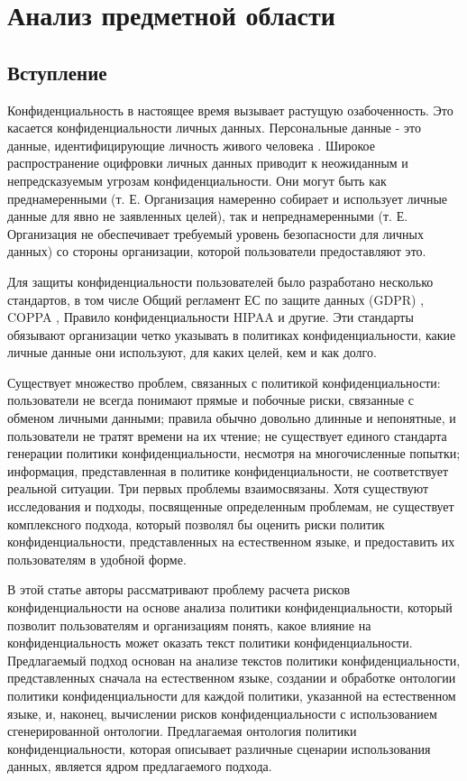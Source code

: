 \documentclass[../main]{subfiles}
\begin{document}
\newpage
\section{Анализ предметной области}

\subsection{Вступление}
Конфиденциальность в настоящее время вызывает растущую озабоченность. Это касается конфиденциальности личных данных. Персональные данные - это данные, идентифицирующие личность живого человека \cite{GDPR}. Широкое распространение оцифровки личных данных приводит к неожиданным и непредсказуемым угрозам конфиденциальности. Они могут быть как преднамеренными (т. Е. Организация намеренно собирает и использует личные данные для явно не заявленных целей), так и непреднамеренными (т. Е. Организация не обеспечивает требуемый уровень безопасности для личных данных) со стороны организации, которой пользователи предоставляют это.

Для защиты конфиденциальности пользователей было разработано несколько стандартов, в том числе Общий регламент ЕС по защите данных (GDPR) \cite{GDPR}, COPPA \cite{MDPI2}, Правило конфиденциальности HIPAA \cite{MDPI3} и другие. Эти стандарты обязывают организации четко указывать в политиках конфиденциальности, какие личные данные они используют, для каких целей, кем и как долго.

Существует множество проблем, связанных с политикой конфиденциальности: пользователи не всегда понимают прямые и побочные риски, связанные с обменом личными данными; правила обычно довольно длинные и непонятные, и пользователи не тратят времени на их чтение; не существует единого стандарта генерации политики конфиденциальности, несмотря на многочисленные попытки; информация, представленная в политике конфиденциальности, не соответствует реальной ситуации. Три первых проблемы взаимосвязаны. Хотя существуют исследования и подходы, посвященные определенным проблемам, не существует комплексного подхода, который позволял бы оценить риски политик конфиденциальности, представленных на естественном языке, и предоставить их пользователям в удобной форме.

В этой статье авторы рассматривают проблему расчета рисков конфиденциальности на основе анализа политики конфиденциальности, который позволит пользователям и организациям понять, какое влияние на конфиденциальность может оказать текст политики конфиденциальности. Предлагаемый подход основан на анализе текстов политики конфиденциальности, представленных сначала на естественном языке, создании и обработке онтологии политики конфиденциальности для каждой политики, указанной на естественном языке, и, наконец, вычислении рисков конфиденциальности с использованием сгенерированной онтологии. Предлагаемая онтология политики конфиденциальности, которая описывает различные сценарии использования данных, является ядром предлагаемого подхода.
\end{document}
